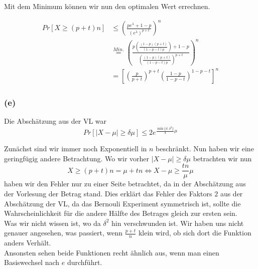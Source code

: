 \documentclass[11pt,a4paper,ngerman]{article}
\begin{document}
Mit dem Minimum können wir nun den optimalen Wert errechnen.

\begin{equation*}\begin{split}
    Pr[X \geq (p+t)n] & \leq \left( \frac{p e^\lambda + 1 -p}{(e^\lambda)^{p+t}} \right)^n\\
        &\stackrel{Min.}{=} \left( \frac{ p (\frac{(1-p)(p+t)}{(1-p-t)p}) + 1 - p}{(\frac{(1-p)(p+t)}{(1-p-t)p})^{p+t}} \right)^n\\
        &= \left[ \left(\frac{p}{p+t}\right)^{p+t} \left( \frac{1-p}{1-p-t}\right)^{1-p-t} \right]^n
\end{split}\end{equation*}

\subsubsection*{(e)}

Die Abschätzung aus der VL war
$$
    Pr [|X - \mu| \geq \delta \mu] \leq 2e^{\frac{\min \{ \delta, \delta^2\}}{4} \mu}
$$

Zunächst sind wir immer noch Exponentiell in $n$ beschränkt. Nun haben wir eine geringfügig andere Betrachtung.
Wo wir vorher $|X-\mu| \geq \delta \mu$  betrachten wir nun
$$
    X \geq (p+t)n = \mu + tn \Leftrightarrow X - \mu \geq \frac{tn}{\mu} \mu
$$
haben wir den Fehler nur zu einer Seite betrachtet, da in der Abschätzung aus der Vorlesung der Betrag stand.
Dies erklärt das Fehler des Faktors $2$ aus der Abschätzung der VL, da das Bernouli Experiment symmetrisch ist,
sollte die Wahrscheinlichkeit für die andere Hälfte des Betrages gleich zur ersten sein.\\


Was wir nicht wissen ist, wo da $\delta^2$ hin verschwunden ist. Wir haben uns nicht genauer angesehen,
was passiert, wenn $\frac{p+t}{n}$ klein wird, ob sich dort die Funktion anders Verhält.\\

Ansonsten sehen beide Funktionen recht ähnlich aus, wenn man einen Basiswechsel nach $e$ durchführt.
\label{LastPage}
\end{document}

